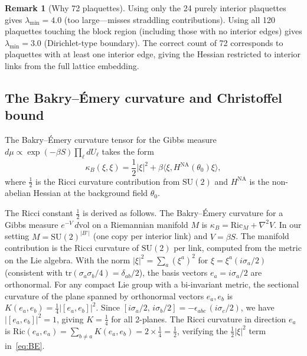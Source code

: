 \documentclass[11pt]{article}
\theoremstyle{definition}
\newtheorem{remark}[theorem]{Remark}
\newcommand{\SU}{\mathrm{SU}}
\newcommand{\tr}{\mathrm{tr}}
\begin{document}
\begin{remark}[Why 72 plaquettes]
Using only the 24 purely interior plaquettes gives $\lambda_{\min}=4.0$
(too large---misses straddling contributions).  Using all 120 plaquettes
touching the block region (including those with no interior edges) gives
$\lambda_{\min}=3.0$ (Dirichlet-type boundary).  The correct count of 72
corresponds to plaquettes with at least one interior edge, giving the
Hessian restricted to interior links from the full lattice embedding.
\end{remark}

\subsection{The Bakry--\'Emery curvature and Christoffel bound}
\label{subsec:antisym}

The Bakry--\'Emery curvature tensor for the Gibbs measure
$d\mu\propto\exp(-\beta S)\prod_\ell dU_\ell$ takes the form
\begin{equation}\label{eq:BE}
\kappa_B(\xi,\xi)
=\frac{1}{2}|\xi|^2+\beta\bigl\langle\xi,
H^{\mathrm{NA}}(\theta_0)\xi\bigr\rangle,
\end{equation}
where $\frac{1}{2}$ is the Ricci curvature contribution from $\SU(2)$
and $H^{\mathrm{NA}}$ is the non-abelian
Hessian at the background field $\theta_0$.

The Ricci constant $\frac{1}{2}$ is derived as follows.
The Bakry--\'Emery curvature for a Gibbs measure
$e^{-V}\,d\mathrm{vol}$ on a Riemannian manifold $M$ is
$\kappa_B=\mathrm{Ric}_M+\nabla^2 V$.  In our setting $M=\SU(2)^{|B^\circ|}$
(one copy per interior link) and $V=\beta S$.  The manifold
contribution is the Ricci curvature of $\SU(2)$ per link, computed
from the metric on the Lie algebra.
With the norm $|\xi|^2=\sum_a(\xi^a)^2$ for $\xi=\xi^a(i\sigma_a/2)$
(consistent with $\tr(\sigma_a\sigma_b/4)=\delta_{ab}/2$), the basis
vectors $e_a=i\sigma_a/2$ are orthonormal.  For any compact Lie group
with a bi-invariant metric, the sectional curvature of the plane
spanned by orthonormal vectors $e_a,e_b$ is
$K(e_a,e_b)=\frac{1}{4}|[e_a,e_b]|^2$.  Since
$[i\sigma_a/2,\,i\sigma_b/2]=-\epsilon_{abc}\,(i\sigma_c/2)$,
we have $|[e_a,e_b]|^2=1$, giving $K=\frac{1}{4}$ for all 2-planes.
The Ricci curvature in direction $e_a$ is
$\mathrm{Ric}(e_a,e_a)=\sum_{b\ne a}K(e_a,e_b)
=2\times\frac{1}{4}=\frac{1}{2}$,
verifying the $\frac{1}{2}|\xi|^2$ term in~\eqref{eq:BE}.
\end{document}
